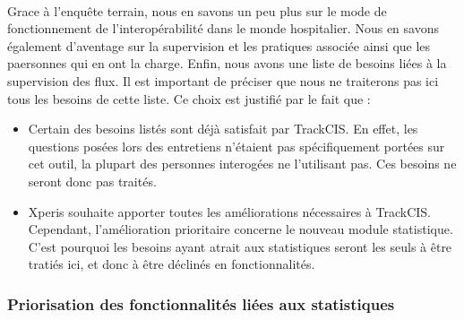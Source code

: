 			\paragraph{}%
			Grace à l'enquête terrain, nous en savons un peu plus sur le mode de
			fonctionnement de l'interopérabilité dans le monde hospitalier. Nous en
			savons également d'aventage sur la supervision et les pratiques associée
			ainsi que les paersonnes qui en ont la charge. Enfin, nous avons une liste de
			besoins liées à la supervision des flux. Il est important de préciser que
			nous ne traiterons pas ici tous les besoins de cette liste. Ce choix est
			justifié par le fait que :
			\begin{itemize}
			  \item Certain des besoins listés sont déjà satisfait par TrackCIS. En
			  effet, les questions posées lors des entretiens n'étaient pas
			  spécifiquement portées sur cet outil, la plupart des personnes interogées
			  ne l'utilisant pas. Ces besoins ne seront donc pas traités.
			  \item Xperis souhaite apporter toutes les améliorations nécessaires à
			  TrackCIS. Cependant, l'amélioration prioritaire concerne le nouveau module
			  statistique. C'est pourquoi les besoins ayant atrait aux statistiques
			  seront les seuls à être tratiés ici, et donc à être déclinés en
			  fonctionnalités.
			\end{itemize}
			
			\paragraph{}%
			
		\subsubsection{Priorisation des fonctionnalités liées aux statistiques}
			\paragraph{}%
			
			\paragraph{}%
			
			\paragraph{}%
	
